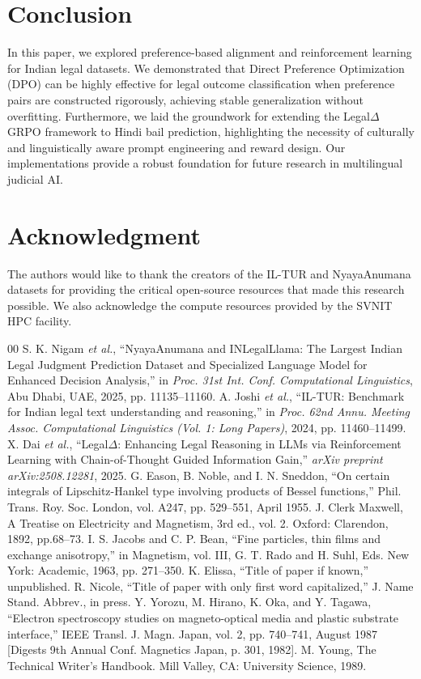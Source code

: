 \documentclass[conference]{IEEEtran}
\begin{document}
\section{Conclusion}
In this paper, we explored preference-based alignment and reinforcement learning for Indian legal datasets. We demonstrated that Direct Preference Optimization (DPO) can be highly effective for legal outcome classification when preference pairs are constructed rigorously, achieving stable generalization without overfitting. Furthermore, we laid the groundwork for extending the Legal$\Delta$ GRPO framework to Hindi bail prediction, highlighting the necessity of culturally and linguistically aware prompt engineering and reward design. Our implementations provide a robust foundation for future research in multilingual judicial AI.
\section*{Acknowledgment}
The authors would like to thank the creators of the IL-TUR and NyayaAnumana datasets for providing the critical open-source resources that made this research possible. We also acknowledge the compute resources provided by the SVNIT HPC facility.
\begin{thebibliography}{00}
 S. K. Nigam \textit{et al.}, ``NyayaAnumana and INLegalLlama: The Largest Indian Legal Judgment Prediction Dataset and Specialized Language Model for Enhanced Decision Analysis,'' in \textit{Proc. 31st Int. Conf. Computational Linguistics}, Abu Dhabi, UAE, 2025, pp. 11135--11160.
 A. Joshi \textit{et al.}, ``IL-TUR: Benchmark for Indian legal text understanding and reasoning,'' in \textit{Proc. 62nd Annu. Meeting Assoc. Computational Linguistics (Vol. 1: Long Papers)}, 2024, pp. 11460--11499.
 X. Dai \textit{et al.}, ``Legal$\Delta$: Enhancing Legal Reasoning in LLMs via Reinforcement Learning with Chain-of-Thought Guided Information Gain,'' \textit{arXiv preprint arXiv:2508.12281}, 2025.
 G. Eason, B. Noble, and I. N. Sneddon, ``On certain integrals of Lipschitz-Hankel type involving products of Bessel functions,'' Phil. Trans. Roy. Soc. London, vol. A247, pp. 529--551, April 1955.
 J. Clerk Maxwell, A Treatise on Electricity and Magnetism, 3rd ed., vol. 2. Oxford: Clarendon, 1892, pp.68--73.
 I. S. Jacobs and C. P. Bean, ``Fine particles, thin films and exchange anisotropy,'' in Magnetism, vol. III, G. T. Rado and H. Suhl, Eds. New York: Academic, 1963, pp. 271--350.
 K. Elissa, ``Title of paper if known,'' unpublished.
 R. Nicole, ``Title of paper with only first word capitalized,'' J. Name Stand. Abbrev., in press.
 Y. Yorozu, M. Hirano, K. Oka, and Y. Tagawa, ``Electron spectroscopy studies on magneto-optical media and plastic substrate interface,'' IEEE Transl. J. Magn. Japan, vol. 2, pp. 740--741, August 1987 [Digests 9th Annual Conf. Magnetics Japan, p. 301, 1982].
 M. Young, The Technical Writer's Handbook. Mill Valley, CA: University Science, 1989.
\end{thebibliography}
\end{document}

